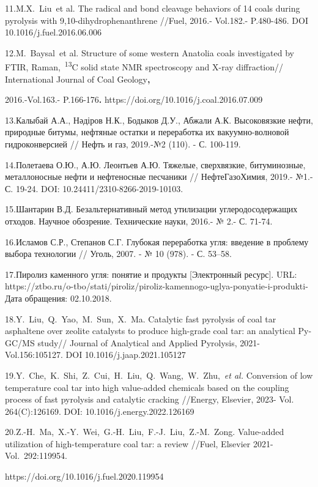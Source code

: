 11.M.X.~Liu\emph{~}et al. The radical and bond cleavage behaviors of 14
coals during pyrolysis with 9,10-dihydrophenanthrene //Fuel, 2016.-
Vol.182.- P.480-486. DOI 10.1016/j.fuel.2016.06.006

12.M.~Baysal\emph{~}et al. Structure of some western Anatolia coals
investigated by FTIR, Raman,~\textsuperscript{13}C solid state NMR
spectroscopy and X-ray diffraction// International Journal of Coal
Geology{\bfseries ,}

2016.-Vol.163.- P.166-176{\bfseries .}
https://doi.org/10.1016/j.coal.2016.07.009

13.Калыбай А.А., Нәдіров Н.К., Бодыков Д.У., Абжали А.К. Высоковязкие
нефти, природные битумы, нефтяные остатки и переработка их
вакуумно-волновой гидроконверсией // Нефть и газ, 2019.-№2 (110). - С.
100-119.

14.Полетаева О.Ю., А.Ю. Леонтьев А.Ю. Тяжелые, сверхвязкие,
битуминозные, металлоносные нефти и нефтеносные песчаники //
НефтеГазоХимия, 2019.- №1.- С. 19-24. DOI:
10.24411/2310-8266-2019-10103.

15.Шантарин В.Д. Безальтернативный метод утилизации углеродосодержащих
отходов. Научное обо­зрение. Технические науки, 2016.- № 2.- С. 71-74.

16.Исламов С.Р., Степанов С.Г. Глубокая переработка угля: введение в
проблему выбора технологии // Уголь, 2007. - № 10 (978). - С. 53--58.

17.Пиролиз каменного угля: понятие и продукты {[}Электронный ресурс{]}.
URL:
https://ztbo.ru/o-tbo/stati/piroliz/piroliz-kamennogo-uglya-ponyatie-i-produkti-Дата
обращения: 02.10.2018.

18.Y.~Liu,~Q.~Yao,~M.~Sun,~X.~Ma. Catalytic fast pyrolysis of coal tar
asphaltene over zeolite catalysts to produce high-grade coal tar: an
analytical Py-GC/MS study// Journal of Analytical and Applied Pyrolysis,
2021-Vol.156:105127. DOI 10.1016/j.jaap.2021.105127

19.Y.~Che,~K.~Shi,~Z.~Cui,~H.~Liu,~Q.~Wang,~W.~Zhu,~\emph{et al.}
Conversion of low temperature coal tar into high value-added chemicals
based on the coupling process of fast pyrolysis and catalytic cracking
//Energy, Elsevier, 2023- Vol. 264(C):126169. DOI:
10.1016/j.energy.2022.126169

20.Z.-H.~Ma,~X.-Y.~Wei,~G.-H.~Liu,~F.-J.~Liu,~Z.-M.~Zong. Value-added
utilization of high-temperature coal tar: a review //Fuel, Elsevier
2021- Vol.~292:119954.

https://doi.org/10.1016/j.fuel.2020.119954

